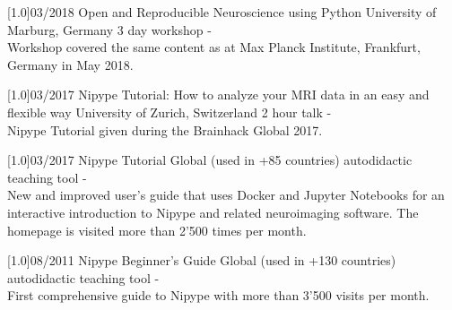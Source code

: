 \documentclass[english]{cv-style}
\begin{document}
\begin{talklist}
\talks
  {\scalebox{.8}[1.0]{03/2018}}
  {Open and Reproducible Neuroscience using Python}
  {University of Marburg, Germany}
{3 day workshop - \\
Workshop covered the same content as at Max Planck Institute, Frankfurt, Germany in May 2018.}
\end{talklist}

\begin{talklist}
\talks
  {\scalebox{.8}[1.0]{03/2017}}
  {Nipype Tutorial: How to analyze your MRI data in an easy and flexible way}
  {University of Zurich, Switzerland}
  {2 hour talk - \\
Nipype Tutorial given during the Brainhack Global 2017.}
\end{talklist}

\begin{talklist}
\talks
  {\scalebox{.8}[1.0]{03/2017}}
  {Nipype Tutorial}
  {Global (used in +85 countries)}
  {autodidactic teaching tool - \\
New and improved user's guide that uses Docker and Jupyter Notebooks for an interactive introduction to Nipype and related neuroimaging software. The homepage is visited more than 2'500 times per month.}
\end{talklist}

\begin{talklist}
\talks
  {\scalebox{.8}[1.0]{08/2011}}
  {Nipype Beginner's Guide}
  {Global (used in +130 countries)}
  {autodidactic teaching tool - \\
First comprehensive guide to Nipype with more than 3'500 visits per month.}
\end{talklist}

\end{document}
